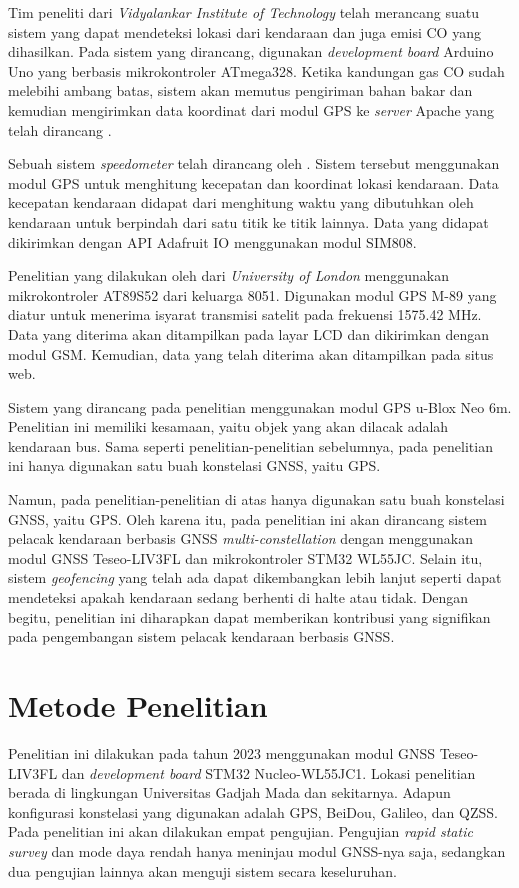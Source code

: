 \documentclass[conference]{IEEEtran}
\begin{document}
Tim peneliti dari \textit{Vidyalankar Institute of Technology} telah merancang suatu sistem yang dapat mendeteksi lokasi dari kendaraan dan juga emisi CO yang dihasilkan. Pada sistem yang dirancang, digunakan \textit{development board} Arduino Uno yang berbasis mikrokontroler ATmega328. Ketika kandungan gas CO sudah melebihi ambang batas, sistem akan memutus pengiriman bahan bakar dan kemudian mengirimkan data koordinat dari modul GPS ke \textit{server} Apache yang telah dirancang \cite{Asha2022}.

Sebuah sistem \textit{speedometer} telah dirancang oleh \cite{Najmurrokhman2021}. Sistem tersebut menggunakan modul GPS untuk menghitung kecepatan dan koordinat lokasi kendaraan. Data kecepatan kendaraan didapat dari menghitung waktu yang dibutuhkan oleh kendaraan untuk berpindah dari satu titik ke titik lainnya. Data yang didapat dikirimkan dengan API Adafruit IO menggunakan modul SIM808.

Penelitian yang dilakukan oleh \cite{Mukhtar2015} dari \textit{University of London} menggunakan mikrokontroler AT89S52 dari keluarga 8051. Digunakan modul GPS M-89 yang diatur untuk menerima isyarat transmisi satelit pada frekuensi 1575.42 MHz. Data yang diterima akan ditampilkan pada layar LCD dan dikirimkan dengan modul GSM. Kemudian, data yang telah diterima akan ditampilkan pada situs web.

Sistem yang dirancang pada penelitian \cite{Widya2016} menggunakan modul GPS u-Blox Neo 6m. Penelitian ini memiliki kesamaan, yaitu objek yang akan dilacak adalah kendaraan bus. Sama seperti penelitian-penelitian sebelumnya, pada penelitian ini hanya digunakan satu buah konstelasi GNSS, yaitu GPS.

Namun, pada penelitian-penelitian di atas hanya digunakan satu buah konstelasi GNSS, yaitu GPS. Oleh karena itu, pada penelitian ini akan dirancang sistem pelacak kendaraan berbasis GNSS \textit{multi-constellation} dengan menggunakan modul GNSS Teseo-LIV3FL dan mikrokontroler STM32 WL55JC. Selain itu, sistem \textit{geofencing} yang telah ada dapat dikembangkan lebih lanjut seperti dapat mendeteksi apakah kendaraan sedang berhenti di halte atau tidak. Dengan begitu, penelitian ini diharapkan dapat memberikan kontribusi yang signifikan pada pengembangan sistem pelacak kendaraan berbasis GNSS.

\section{Metode Penelitian}
Penelitian ini dilakukan pada tahun 2023 menggunakan modul GNSS Teseo-LIV3FL dan \textit{development board} STM32 Nucleo-WL55JC1. Lokasi penelitian berada di lingkungan Universitas Gadjah Mada dan sekitarnya. Adapun konfigurasi konstelasi yang digunakan adalah GPS, BeiDou, Galileo, dan QZSS. Pada penelitian ini akan dilakukan empat pengujian. Pengujian \textit{rapid static survey} dan mode daya rendah hanya meninjau modul GNSS-nya saja, sedangkan dua pengujian lainnya akan menguji sistem secara keseluruhan.
\end{document}
